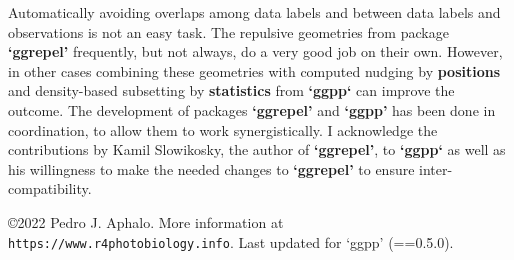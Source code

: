 \documentclass[DIV=25,a3,landscape,9pt]{scrartcl}\usepackage[]{graphicx}\usepackage[]{xcolor}
\begin{document}
\begin{multicols}{3}
Automatically avoiding overlaps among data labels and between data labels and observations is not an easy task. The repulsive geometries from package \textbf{`ggrepel'} frequently, but not always, do a very good job on their own. However, in other cases combining these geometries with computed nudging by \textbf{positions} and density-based subsetting by \textbf{statistics} from \textbf{`ggpp`} can improve the outcome. The development of packages \textbf{`ggrepel'} and \textbf{`ggpp'} has been done in coordination, to allow them to work synergistically. I acknowledge the contributions by Kamil Slowikosky, the author of \textbf{`ggrepel'}, to \textbf{`ggpp`} as well as his willingness to make the needed changes to \textbf{`ggrepel'} to ensure inter-compatibility.

\end{multicols}
\vfill
\centering
\noindent
\copyright 2022 Pedro J. Aphalo. More information at \texttt{https://www.r4photobiology.info}. Last updated for `ggpp' (==0.5.0).
\end{document}
